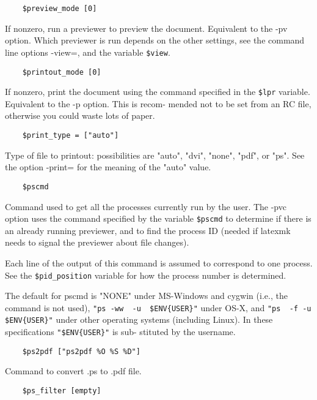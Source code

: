 \begin{verbatim}
	$preview_mode [0]
\end{verbatim}

If nonzero, run a previewer to preview the document.  Equivalent
to the -pv option.  Which previewer is run depends on the  other
settings,  see the command line options -view=, and the variable
\verb|$view|.

\begin{verbatim}
	$printout_mode [0]
\end{verbatim}

If nonzero, print the document using the  command  specified  in
the \verb|$lpr| variable.  Equivalent to the -p option.  This is recom-
mended not to be set from an RC file, otherwise you could  waste
lots of paper.

\begin{verbatim}
	$print_type = ["auto"]
\end{verbatim}

Type  of  file  to  printout:  possibilities  are "auto", "dvi",
"none", "pdf", or "ps".   See the option -print= for the meaning
of the "auto" value.

\begin{verbatim}
	$pscmd 
\end{verbatim}

Command used to get all the processes currently run by the user.
The -pvc option uses  the  command  specified  by  the  variable
\verb|$pscmd|  to  determine  if there is an already running previewer,
and to find the process ID (needed if latexmk  needs  to  signal
the previewer about file changes).

Each line of the output of this command is assumed to correspond
to one process.  See the  \verb|$pid_position|  variable  for  how  the
process number is determined.

The  default  for  pscmd  is  "NONE" under MS-Windows and cygwin
(i.e., the command is not used), \verb|"ps -ww  -u  $ENV{USER}"|  under
OS-X,  and  \verb|"ps  -f -u $ENV{USER}"| under other operating systems
(including Linux).  In these specifications \verb|"$ENV{USER}"| is sub-
stituted by the username.

\begin{verbatim}
	$ps2pdf ["ps2pdf %O %S %D"]
\end{verbatim}

Command to convert .ps to .pdf file.

\begin{verbatim}
	$ps_filter [empty]
\end{verbatim}

